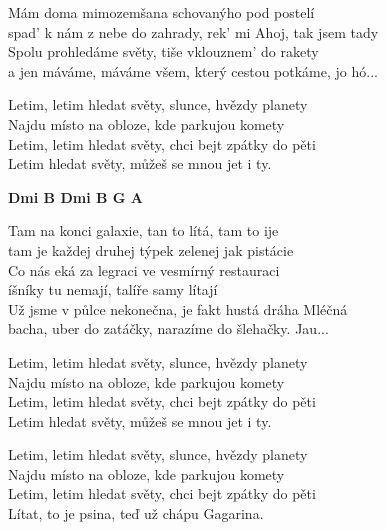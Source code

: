 
\ve{}
Mám doma mimozemšana schovanýho pod postelí\\
spad' k nám z nebe do zahrady, rek' mi Ahoj, tak jsem tady\\
Spolu prohledáme světy, tiše vklouznem' do rakety\\
a jen máváme, máváme všem, který cestou potkáme, jo hó...

\cho{}
Letim, letim hledat světy, slunce, hvězdy planety\\
Najdu místo na obloze, kde parkujou komety\\
Letim, letim hledat světy, chci bejt zpátky do pěti\\
Letim hledat světy, můžeš se mnou jet i ty. 

\re{}
{\footnotesize\textbf{Dmi B Dmi B G A}}

\ve{}
Tam na konci galaxie, tan to lítá, tam to ije\\
tam je každej druhej týpek zelenej jak pistácie\\
Co nás eká za legraci ve vesmírný restauraci\\
íšníky tu nemají, talíře samy lítají\\
Už jsme v půlce nekonečna, je fakt hustá dráha Mléčná\\
bacha, uber do zatáčky, narazíme do šlehačky. Jau...

\cho{}
Letim, letim hledat světy, slunce, hvězdy planety\\
Najdu místo na obloze, kde parkujou komety\\
Letim, letim hledat světy, chci bejt zpátky do pěti\\
Letim hledat světy, můžeš se mnou jet i ty. 

\cho{}
Letim, letim hledat světy, slunce, hvězdy planety\\
Najdu místo na obloze, kde parkujou komety\\
Letim, letim hledat světy, chci bejt zpátky do pěti\\
Lítat, to je psina, teď už chápu Gagarina. 

\esong{}
